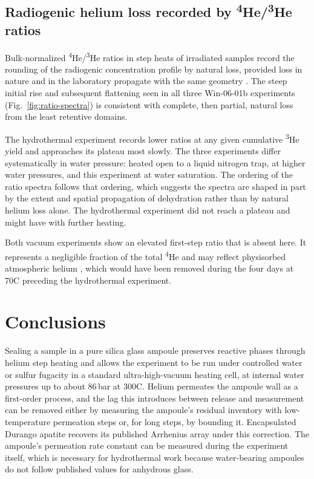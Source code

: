 \subsection{Radiogenic helium loss recorded by \textsuperscript{4}He/\textsuperscript{3}He ratios}\label{sec:discussion-ratios}

Bulk-normalized \textsuperscript{4}He/\textsuperscript{3}He ratios in step heats of irradiated samples record the rounding of the radiogenic concentration profile by natural loss, provided loss in nature and in the laboratory propagate with the same geometry \citep{shuster2004,farley2024}. The steep initial rise and subsequent flattening seen in all three Win-06-01b experiments (Fig.~\ref{fig:ratio-spectra}) is consistent with complete, then partial, natural loss from the least retentive domains.

The hydrothermal experiment records lower ratios at any given cumulative \textsuperscript{3}He yield and approaches its plateau most slowly. The three experiments differ systematically in water pressure: \citet{farley2024} heated open to a liquid nitrogen trap, \citet{monteiro2017} at higher water pressures, and this experiment at water saturation. The ordering of the ratio spectra follows that ordering, which suggests the spectra are shaped in part by the extent and spatial propagation of dehydration rather than by natural helium loss alone. The hydrothermal experiment did not reach a plateau and might have with further heating.

Both vacuum experiments show an elevated first-step ratio that is absent here. It represents a negligible fraction of the total \textsuperscript{4}He and may reflect physisorbed atmospheric helium \citep{protin2016}, which would have been removed during the four days at 70\textdegree C preceding the hydrothermal experiment.

\section{Conclusions}\label{sec:conclusions}

Sealing a sample in a pure silica glass ampoule preserves reactive phases through helium step heating and allows the experiment to be run under controlled water or sulfur fugacity in a standard ultra-high-vacuum heating cell, at internal water pressures up to about 86\,bar at 300\textdegree C. Helium permeates the ampoule wall as a first-order process, and the lag this introduces between release and measurement can be removed either by measuring the ampoule's residual inventory with low-temperature permeation steps or, for long steps, by bounding it. Encapsulated Durango apatite recovers its published Arrhenius array under this correction. The ampoule's permeation rate constant can be measured during the experiment itself, which is necessary for hydrothermal work because water-bearing ampoules do not follow published values for anhydrous glass.

